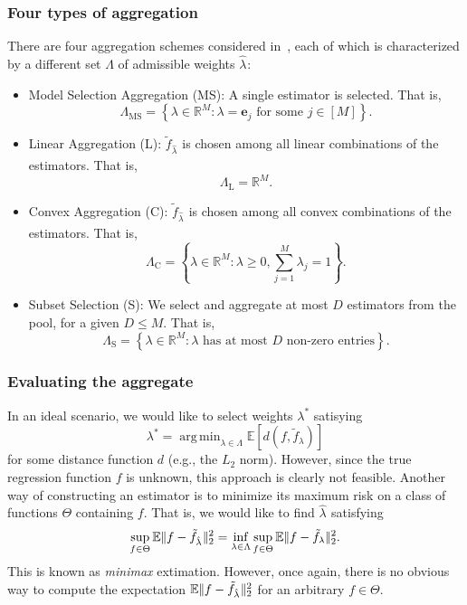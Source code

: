 \documentclass[12pt, letter paper]{article}
\newcommand{\1}{\mathmybb{1}}
\DeclareMathOperator*{\argmin}{arg\,min}
\newcommand{\R}{\mathbb{R}}
\newcommand{\0}{\emptyset}
\newcommand{\E}{\mathbb{E}}
\newcommand{\Ep}[1]{\mathbb{E}\left[ #1 \right]}
\newcommand{\paren}[1]{\left(#1 \right)}
\newcommand{\set}[1]{\left\{ #1 \right\}}
\newcommand{\norm}[1]{|\hspace{-1pt}|#1 |\hspace{-1pt}|}
\newcommand{\normsq}[1]{\norm{#1}^{2}}
\newcommand{\ftilde}[1]{\tilde{f}_{#1}}
\newcommand{\lambdahat}[1]{\hat{\lambda}_{#1}}
\begin{document}
\subsubsection{Four types of aggregation}

There are four aggregation schemes considered in~\textcite{bunea_2007}, each of which is characterized by a different set \(\Lambda\) of admissible weights \(\lambdahat{}\):
\begin{itemize}
    \item Model Selection Aggregation (MS): A single estimator is selected. That is,\[\Lambda_{\mathrm{MS}} = \set{\lambda\in\R^{M}:\lambda = \boldsymbol{e}_{j}\text{ for some }j\in[M]}.\]
    \item Linear Aggregation (L): \(\ftilde{\lambdahat{}}\) is chosen among all linear combinations of the estimators. That is, \[\Lambda_{\mathrm{L}} = \R^{M}.\]
    \item Convex Aggregation (C): \(\ftilde{\lambdahat{}}\) is chosen among all convex combinations of the estimators. That is, \[\Lambda_{\mathrm{C}} = \set{\lambda\in\R^{M}:\lambda\geq 0, \sum_{j=1}^{M}\lambda_{j} = 1}.\]
    \item Subset Selection (S): We select and aggregate at most \(D\) estimators from the pool, for a given \(D\leq M\). That is, \[\Lambda_{\mathrm{S}} = \set{\lambda\in\R^{M}:\lambda\text{ has at most \(D\) non-zero entries}}.\]
\end{itemize}

\subsubsection{Evaluating the aggregate}

In an ideal scenario, we would like to select  weights \(\lambda^*\) satisying 
\[\lambda^{*} = \argmin_{\lambda\in\Lambda}\Ep{d\paren{f, \ftilde{\lambda}}}\]
for some distance function \(d\) (e.g., the \(L_{2}\) norm). However, since the true regression function \(f\) is unknown, this approach is clearly not feasible. Another way of constructing an estimator is to minimize its maximum risk on a class of functions \(\Theta\) containing \(f\). That is, we would like to find \(\lambdahat{}\) satisfying 
\[\sup_{f\in\Theta}\E\normsq{f-\ftilde{\lambdahat{}}}_{2} = \inf_{\lambda\in\Lambda}\sup_{f\in\Theta}\E\normsq{f-\ftilde{\lambda}}_{2}.\]
This is known as \emph{minimax} extimation. 
However, once again, there is no obvious way to compute the expectation \(\E\normsq{f-\ftilde{\lambdahat{}}}_{2}\) for an arbitrary \(f\in\Theta\).
\end{document}
